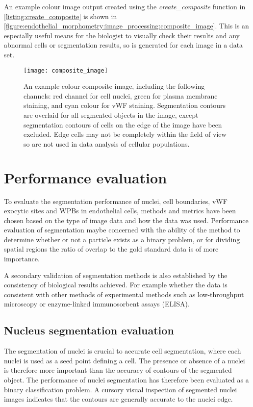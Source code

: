 An example colour image output created using the \emph{create\_composite} function in \autoref{listing:create_composite} is shown in \autoref{figure:endothelial_morphometry:image_processing:composite_image}. This is an especially useful means for the biologist to visually check their results and any abnormal cells or segmentation results, so is generated for each image in a data set.

\begin{figure}[htbp!] %
	\centering
	\texttt{[image: composite\_image]}
	\caption[Colour composite image with segmentation contours]{An example colour composite image, including the following channels: red channel for cell nuclei, green for plasma membrane staining, and cyan colour for vWF staining. Segmentation contours are overlaid for all segmented objects in the image, except segmentation contours of cells on the edge of the image have been excluded. Edge cells may not be completely within the field of view so are not used in data analysis of cellular populations.}
	\label{figure:endothelial_morphometry:image_processing:composite_image}
\end{figure}

\section{Performance evaluation}
\label{endothelial_morphometry:performance_evaluation}
To evaluate the segmentation performance of nuclei, cell boundaries, vWF exocytic sites and WPBs in endothelial cells, methods and metrics have been chosen based on the type of image data and how the data was used. Performance evaluation of segmentation maybe concerned with the ability of the method to determine whether or not a particle exists as a binary problem, or for dividing spatial regions the ratio of overlap to the gold standard data is of more importance.

A secondary validation of segmentation methods is also established by the consistency of biological results achieved. For example whether the data is consistent with other methods of experimental methods such as low-throughput microscopy or enzyme-linked immunosorbent assays (ELISA).

\subsection{Nucleus segmentation evaluation}
\label{endothelial_morphometry:performance_evaluation:nucleus}
The segmentation of nuclei is crucial to accurate cell segmentation, where each nuclei is used as a seed point defining a cell. The presence or absence of a nuclei is therefore more important than the accuracy of contours of the segmented object. The performance of nuclei segmentation has therefore been evaluated as a binary classification problem. A cursory visual inspection of segmented nuclei images indicates that the contours are generally accurate to the nuclei edge.

